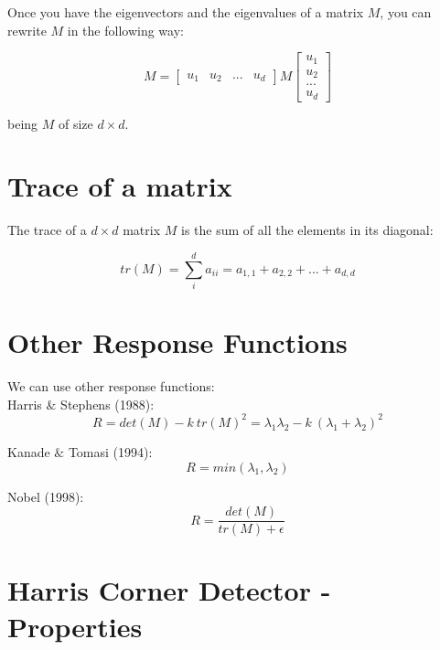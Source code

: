 \documentclass{article}
\begin{document}
Once you have the eigenvectors and the eigenvalues of a matrix $M$, you can rewrite $M$ in the following way:

\begin{equation*}
    M = \begin{bmatrix} 
        u_1 & u_2 & ... & u_d 
    \end{bmatrix} 
    M 
    \begin{bmatrix} 
        u_1 \\ u_2 \\ ... \\ u_d 
    \end{bmatrix} 
\end{equation*}

being $M$ of size $d \times d$.

\section*{Trace of a matrix}

The trace of a $d\times d$ matrix $M$ is the sum of all the elements in its diagonal:

\begin{equation*}
    tr(M) = \sum_{i}^{d} a_{ii} = a_{1,1} + a_{2,2} + ... + a_{d,d}
\end{equation*}

\newpage

\section*{Other Response Functions}

We can use other response functions: \\

Harris $\&$ Stephens (1988):
\begin{equation*}
    R = det(M) - k\ tr(M)^2 = \lambda_1 \lambda_2 - k\ (\lambda_1 + \lambda_2)^2
\end{equation*}

Kanade $\&$ Tomasi (1994):
\begin{equation*}
    R = min(\lambda_1, \lambda_2)
\end{equation*}

Nobel (1998):
\begin{equation*}
    R = \frac{det(M)}{tr(M) + \epsilon}
\end{equation*}

\newpage

\section*{Harris Corner Detector - Properties}
\end{document}
